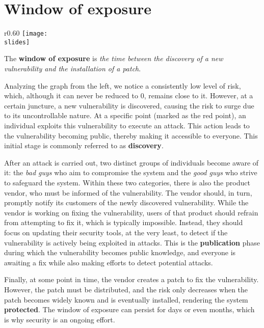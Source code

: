 \newpage
\section{Window of exposure}
\begin{wrapfigure}{r}{0.60\textwidth}
\centering
    \texttt{[image: \\slides]}
\end{wrapfigure}
The \textbf{window of exposure} is \emph{the time between the discovery of a new vulnerability and the installation of a patch}.


Analyzing the graph from the left, we notice a consistently low level of risk, which, although it can never be reduced to 0, remains close to it.
However, at a certain juncture, a new vulnerability is discovered, causing the risk to surge due to its uncontrollable nature.
At a specific point (marked as the red point), an individual exploits this vulnerability to execute an attack. This action leads to the vulnerability becoming public, thereby making it accessible to everyone.
This initial stage is commonly referred to as \textbf{discovery}.

After an attack is carried out, two distinct groups of individuals become aware of it: the \emph{bad guys} who aim to compromise the system and the \emph{good guys} who strive to safeguard the system. Within these two categories, there is also the product vendor, who must be informed of the vulnerability. The vendor should, in turn, promptly notify its customers of the newly discovered vulnerability. While the vendor is working on fixing the vulnerability, users of that product should refrain from attempting to fix it, which is typically impossible. Instead, they should focus on updating their security tools, at the very least, to detect if the vulnerability is actively being exploited in attacks. This is the \textbf{publication} phase during which the vulnerability becomes public knowledge, and everyone is awaiting a fix while also making efforts to detect potential attacks.

Finally, at some point in time, the vendor creates a patch to fix the vulnerability. However, the patch must be distributed, and the risk only decreases when the patch becomes widely known and is eventually installed, rendering the system \textbf{protected}. The window of exposure can persist for days or even months, which is why security is an ongoing effort.

